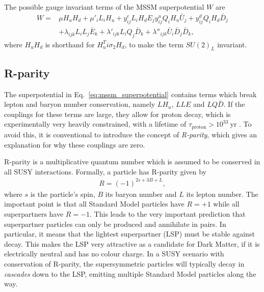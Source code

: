 \documentclass[twoside,english]{uiofysmaster}
\begin{document}
The possible gauge invariant terms of the MSSM superpotential $W$ are
\begin{align}
	W = &\mu H_u H_d + \mu'_i L_i H_u + y_{ij}^e L_i H_d E_j y_{ij}^u Q_i H_u \bar U_j + y_{ij}^d Q_i H_d \bar D_j \label{eq:mssm_superpotential} \\
		&+\lambda_{ijk}L_i L_j \bar E_k + \lambda'_{ijk} L_i Q_j \bar D_k + \lambda''_{ijk} \bar U_i \bar D_j \bar D_k,\nonumber
\end{align} 
where $H_u H_d$ is shorthand for $H_u^T i \sigma_2 H_d$, to make the term $SU(2)_L$ invariant. 

\subsection{R-parity}
The superpotential in Eq.\ \eqref{eq:mssm_superpotential} contains terms which break lepton and baryon number conservation, namely $LH_u$, $LLE$ and $LQ\bar D$. If the couplings for these terms are large, they allow for proton decay, which is experimentally very heavily constrained, with a lifetime of $\tau_\mathrm{proton} > 10^{33} ~\mathrm{yr}$ \cite{Agashe:2014kda}. To avoid this, it is conventional to introduce the concept of {\it R-parity}, which gives an explanation for why these couplings are zero.

R-parity is a multiplicative quantum number which is assumed to be conserved in all SUSY interactions. Formally, a particle has R-parity given by
\begin{align}
	R = (-1)^{2s + 3B + L},
\end{align}
where $s$ is the particle's spin, $B$ its baryon number and $L$ its lepton number. The important point is that all Standard Model particles have $R=+1$ while all superpartners have $R = -1$. This leads to the very important prediction that superpartner particles can only be produced and annihilate in pairs. In particular, it means that the lightest superpartner (LSP) must be stable against decay. This makes the LSP very attractive as a candidate for Dark Matter, if it is electrically neutral and has no colour charge. In a SUSY scenario with conservation of R-parity, the supersymmetric particles will typically decay in {\it cascades} down to the LSP, emitting multiple Standard Model particles along the way.
\end{document}
